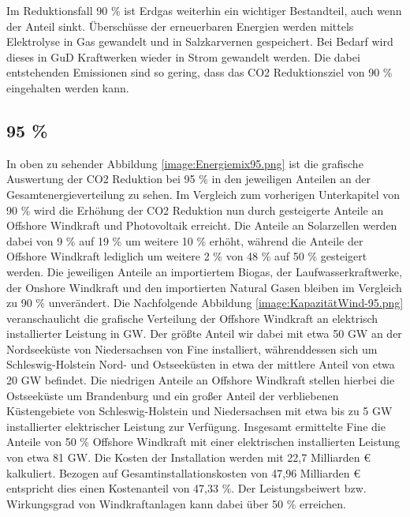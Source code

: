 Im Reduktionsfall 90 \% ist Erdgas weiterhin ein wichtiger Bestandteil, auch wenn der Anteil sinkt. Überschüsse der erneuerbaren Energien werden mittels Elektrolyse in Gas gewandelt und in Salzkarvernen gespeichert. Bei Bedarf wird dieses in GuD Kraftwerken wieder in Strom gewandelt werden. Die dabei entstehenden Emissionen sind so gering, dass das CO2 Reduktionsziel von 90 \% eingehalten werden kann. 

\subsection{95 \%}


In oben zu sehender Abbildung \ref{image:Energiemix95.png} ist die grafische Auswertung der CO2 Reduktion bei 95 \% in den jeweiligen Anteilen an der Gesamtenergieverteilung zu sehen. Im Vergleich zum vorherigen Unterkapitel von 90 \% wird die Erhöhung der CO2 Reduktion nun durch gesteigerte Anteile an Offshore Windkraft und Photovoltaik erreicht. Die Anteile an Solarzellen werden dabei von 9 \% auf 19 \% um weitere 10 \% erhöht, während die Anteile der Offshore Windkraft lediglich um weitere 2 \% von 48 \% auf 50 \% gesteigert werden. Die jeweiligen Anteile an importiertem Biogas, der Laufwasserkraftwerke, der Onshore Windkraft und den importierten Natural Gasen bleiben im Vergleich zu 90 \% unverändert. 
Die Nachfolgende Abbildung \ref{image:KapazitätWind-95.png} veranschaulicht die grafische Verteilung der Offshore Windkraft an elektrisch installierter Leistung in GW. Der größte Anteil wir dabei mit etwa 50 GW an der Nordseeküste von Niedersachsen von Fine installiert, währenddessen sich um Schleswig-Holstein Nord- und Ostseeküsten in etwa der mittlere Anteil von etwa 20 GW befindet. Die niedrigen Anteile an Offshore Windkraft stellen hierbei die Ostseeküste um Brandenburg und ein großer Anteil der verbliebenen Küstengebiete von Schleswig-Holstein und Niedersachsen mit etwa bis zu 5 GW installierter elektrischer Leistung zur Verfügung. Insgesamt ermittelte Fine die Anteile von 50 \% Offshore Windkraft mit einer elektrischen installierten Leistung von etwa 81 GW. Die Kosten der Installation werden mit 22,7 Milliarden € kalkuliert. Bezogen auf Gesamtinstallationskosten von 47,96 Milliarden € entspricht dies einen Kostenanteil von 47,33  \%. Der Leistungsbeiwert bzw. Wirkungsgrad von Windkraftanlagen kann dabei über 50 \% erreichen.  

